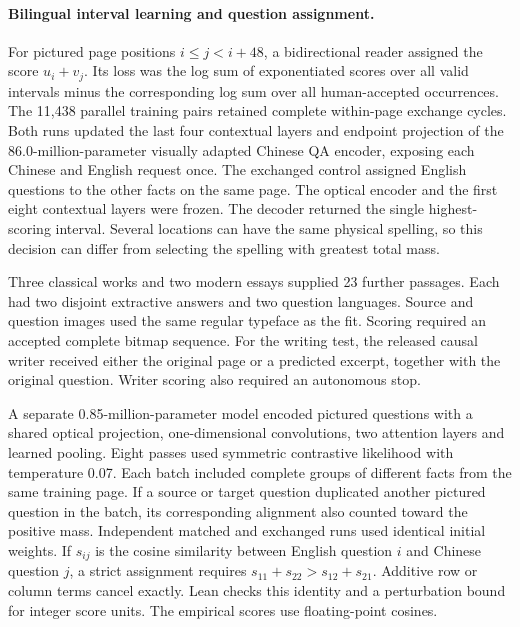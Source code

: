\paragraph{Bilingual interval learning and question assignment.}
For pictured page positions $i\le j<i+48$, a bidirectional reader assigned the score $u_i+v_j$. Its loss was the log sum of exponentiated scores over all valid intervals minus the corresponding log sum over all human-accepted occurrences. The 11,438 parallel training pairs retained complete within-page exchange cycles. Both runs updated the last four contextual layers and endpoint projection of the 86.0-million-parameter visually adapted Chinese QA encoder, exposing each Chinese and English request once. The exchanged control assigned English questions to the other facts on the same page. The optical encoder and the first eight contextual layers were frozen. The decoder returned the single highest-scoring interval. Several locations can have the same physical spelling, so this decision can differ from selecting the spelling with greatest total mass.

Three classical works and two modern essays supplied 23 further passages. Each had two disjoint extractive answers and two question languages. Source and question images used the same regular typeface as the fit. Scoring required an accepted complete bitmap sequence. For the writing test, the released causal writer received either the original page or a predicted excerpt, together with the original question. Writer scoring also required an autonomous stop.

A separate 0.85-million-parameter model encoded pictured questions with a shared optical projection, one-dimensional convolutions, two attention layers and learned pooling. Eight passes used symmetric contrastive likelihood with temperature 0.07. Each batch included complete groups of different facts from the same training page. If a source or target question duplicated another pictured question in the batch, its corresponding alignment also counted toward the positive mass. Independent matched and exchanged runs used identical initial weights. If $s_{ij}$ is the cosine similarity between English question $i$ and Chinese question $j$, a strict assignment requires $s_{11}+s_{22}>s_{12}+s_{21}$. Additive row or column terms cancel exactly. Lean checks this identity and a perturbation bound for integer score units. The empirical scores use floating-point cosines.
